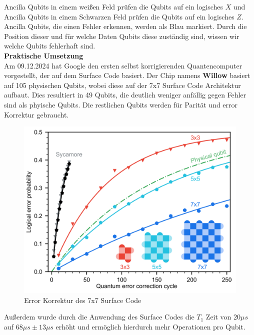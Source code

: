 Ancilla Qubits in einem weißen Feld prüfen die Qubits auf ein logisches $X$ und Ancilla Qubits in einem Schwarzen Feld prüfen die Qubits auf ein logisches $Z$.\\

Ancilla Qubits, die einen Fehler erkennen, werden als Blau markiert. Durch die Position dieser und für welche Daten Qubits diese zuständig sind, wissen wir welche Qubits fehlerhaft sind.\\

\textbf{Praktische Umsetzung}\\
Am 09.12.2024 hat Google den ersten selbst korrigierenden Quantencomputer vorgestellt, der auf dem Surface Code basiert.
Der Chip namens \textbf{Willow} basiert auf 105 physischen Qubits, wobei diese auf der 7x7 Surface Code Architektur aufbaut.
Dies resultiert in 49 Qubits, die deutlich weniger anfällig gegen Fehler sind als phyische Qubits. Die restlichen Qubits werden für Parität und error Korrektur gebraucht.\\

\begin{figure}[H]
    \centering
    \includegraphics[width=0.7\linewidth]{img/Surface-Code-Scaling.png}
    \caption{Error Korrektur des 7x7 Surface Code}
    \label{fig:Willow}
\end{figure}

Außerdem wurde durch die Anwendung des Surface Codes die $T_1$ Zeit von $20\mu s$ auf $68\mu s\pm13\mu s$ erhöht und ermöglich hierdurch mehr Operationen pro Qubit.\\